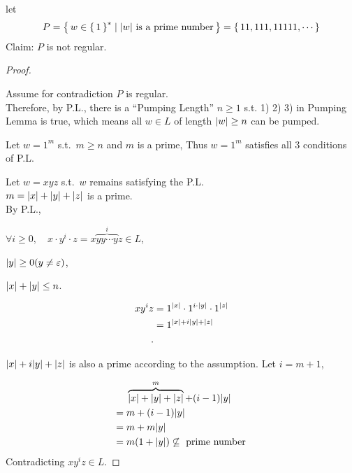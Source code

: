 \begin{example}
    let
    \[
        P = { \left\{\, w \in { \left\{\,1\,\right\} }^* \mid \text{${ \left\lvert w \right\rvert }$ is a prime number} \,\right\} } 
        = { \left\{\,11,111,11111, \cdots\,\right\} }
    \]
    Claim: $P$ is not regular.

    \begin{proof}\

        Assume for contradiction $P$ is regular. \\
        Therefore, by P.L.,
        there is a ``Pumping Length'' $n \ge 1$ s.t.
        1) 2) 3) in Pumping Lemma is true, which means
        all $w \in L$ of length ${ \left\lvert w \right\rvert } \ge n$ can be pumped.

        Let $w = 1^m$ s.t.\ $m \ge n$ and $m$ is a prime,
        Thus $w = 1^m$ satisfies all 3 conditions of P.L.

        Let
        $w = xyz$ s.t.\ $w$ remains satisfying the P.L. \\
        $m = { \left\lvert x \right\rvert } + { \left\lvert y \right\rvert } + { \left\lvert z \right\rvert } $ is a prime. \\
        By P.L.,
        \begin{compactenum}
        \item 
            $
            \forall i \ge 0, \quad
            x \cdot y^i \cdot z = x \overbrace{yy \cdots y}^i z \in L
            $,
        \item
            $
            { \left\lvert y \right\rvert } \ge 0 ( y \neq \varepsilon)
            $,
        \item
            $
            { \left\lvert x \right\rvert } + { \left\lvert y \right\rvert } \le n
            $.
        \end{compactenum}

        \begin{align*}
            x y^i z
            &= 1^{{ \left\lvert x \right\rvert }} \cdot 1^{i \cdot { \left\lvert y \right\rvert }} \cdot 1^{{ \left\lvert z \right\rvert }}  \\
            &= 1^{{ \left\lvert x \right\rvert } + i { \left\lvert y \right\rvert } + { \left\lvert z \right\rvert }}  \\
        .\end{align*}

        ${{ \left\lvert x \right\rvert } + i { \left\lvert y \right\rvert } + { \left\lvert z \right\rvert }}$ is also a prime according to the assumption.
        Let
        $i = m+1$,

        \begin{align*}
            &\phteq \overbrace{\abs x + \abs y + \abs z}^m + (i-1)\abs y  \\
            &=      m + (i-1)\abs y  \\
            &=      m + m\abs y  \\
            &=      m(1+\abs y) \not \subseteq \text{ prime number }
            \end{align*}
        Contradicting
        $xy^iz \in L$.
    \end{proof}

\end{example}

